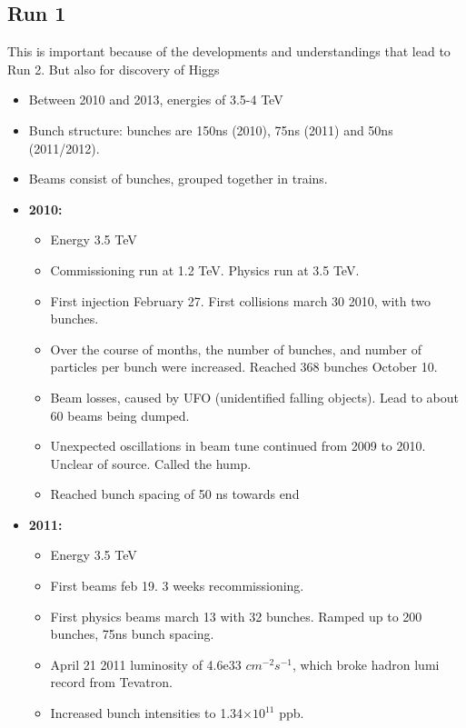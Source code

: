 \subsection{Run 1}
This is important because of the developments and understandings that lead to Run 2. But also for discovery of Higgs
\begin{itemize}
    \item Between 2010 and 2013, energies of 3.5-4 TeV \cite{lhcRun1}
    \item Bunch structure: bunches are 150ns (2010), 75ns (2011) and 50ns (2011/2012). \cite{lhcRun1}
    \item Beams consist of bunches, grouped together in trains. \cite{lhcRun1}
    \item \textbf{2010:} \cite{lhcRun1}
    \begin{itemize}
        \item Energy 3.5 TeV \cite{lhcRun1}
        \item Commissioning run at 1.2 TeV. Physics run at 3.5 TeV. \cite{lhcRun1}
        \item First injection February 27. First collisions march 30 2010, with two bunches. \cite{lhcRun1}
        \item Over the course of months, the number of bunches, and number of particles per bunch were increased. Reached 368 bunches October 10. \cite{lhcRun1}
        \item Beam losses, caused by UFO (unidentified falling objects).  Lead to about 60 beams being dumped. \cite{lhcRun1}
        \item Unexpected oscillations in beam tune continued from 2009 to 2010. Unclear of source. Called the hump. \cite{lhcRun1}
        \item Reached bunch spacing of 50 ns towards end \cite{lhcRun1}
    \end{itemize}
    \item \textbf{2011:} \cite{lhcRun1}
    \begin{itemize}
        \item Energy 3.5 TeV \cite{lhcRun1}
        \item First beams feb 19. 3 weeks recommissioning. \cite{lhcRun1}
        \item First physics beams march 13 with 32 bunches. Ramped up to 200 bunches, 75ns bunch spacing. \cite{lhcRun1}
        \item April 21 2011 luminosity of 4.6e33 $cm^{-2}s^{-1}$, which broke hadron lumi record from Tevatron. \cite{lhcRun1}
        \item Increased bunch intensities to 1.34$\times10^{11}$ ppb. \cite{lhcRun1}

\end{itemize}
\end{itemize}
